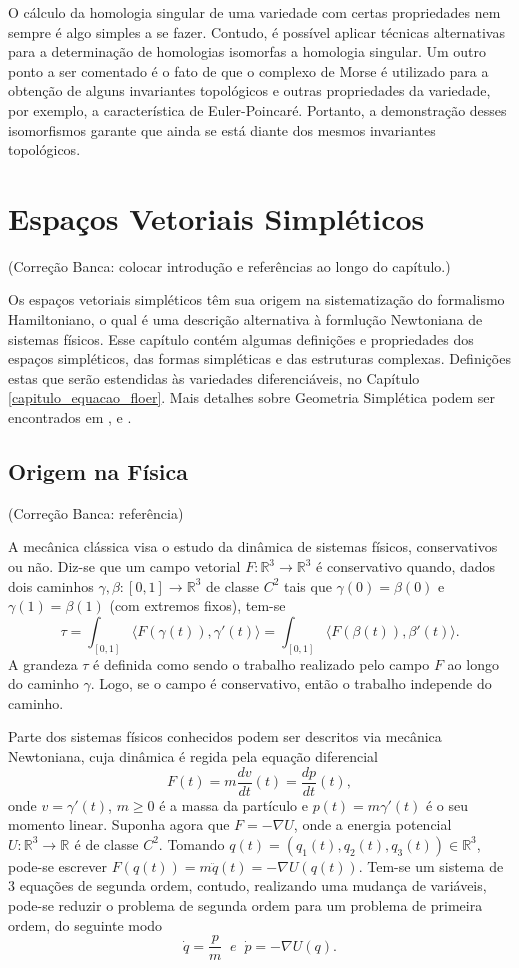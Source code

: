 \documentclass[12pt]{book}
\newcommand{\derivada}[2]{\frac{d #1}{d #2}}
\newcommand{\intervalo}{[0,1]}
\newcommand{\produtointerno}[2]{\langle #1, #2 \rangle}
\newcommand{\real}[1]{\mathbb{R}^{#1}}
\newcommand{\reta}{\real{}}
\newcommand{\alerta}[1]{{\color{red}#1}}
\newcommand{\correcaobanca}[1]{\alerta{(Correção Banca: #1)}}
\begin{document}
	O cálculo da homologia singular de uma variedade com certas propriedades nem sempre é algo simples a se fazer. Contudo, é possível aplicar técnicas alternativas para a determinação de homologias isomorfas a homologia singular. Um outro ponto a ser comentado é o fato de que o complexo de Morse é utilizado para a obtenção de alguns invariantes topológicos e outras propriedades  da variedade, por exemplo, a característica de Euler-Poincaré. Portanto, a demonstração desses isomorfismos garante que ainda se está diante dos mesmos invariantes topológicos.
	
	
	\chapter{Espaços Vetoriais Simpléticos}\label{capitulo_espacos_vetoriais_simpleticos}
	\correcaobanca{colocar introdução e referências ao longo do capítulo.}
	
	Os espaços vetoriais simpléticos têm sua origem na sistematização do formalismo Hamiltoniano, o qual é uma descrição alternativa à formlução Newtoniana de sistemas físicos. Esse capítulo contém algumas definições e propriedades dos espaços simpléticos, das formas simpléticas e das estruturas complexas. Definições estas que serão estendidas às variedades diferenciáveis, no Capítulo \ref{capitulo_equacao_floer}. Mais detalhes sobre Geometria Simplética podem ser encontrados em \cite{berndt}, \cite{bursztyn_macarini} e \cite{cannas_anna}. 
	
	\section{Origem na Física}
	\correcaobanca{referência}
	
	A mecânica clássica visa o estudo da dinâmica de sistemas físicos, conservativos ou não. Diz-se que um campo vetorial $F:\real{3} \to \real{3}$ é conservativo quando, dados dois caminhos $\gamma,\beta:[0,1] \to \real{3}$ de classe $C^{2}$ tais que $\gamma(0)=\beta(0)$ e $\gamma(1)=\beta(1)$ (com extremos fixos), tem-se
	$$
	\tau=\int_{\intervalo} \produtointerno{F(\gamma(t))}{\gamma'(t)}=
	\int_{\intervalo} \produtointerno{F(\beta(t))}{\beta'(t)}.
	$$
	A grandeza $\tau$ é definida como sendo o trabalho realizado pelo campo $F$ ao longo do caminho $\gamma$. Logo, se o campo é conservativo, então o trabalho independe do caminho.
	
	Parte dos sistemas físicos conhecidos podem ser descritos via mecânica Newtoniana, cuja dinâmica é regida pela equação diferencial 
	$$
	F(t) = m\derivada{v}{t}(t) = \derivada{p}{t}(t),
	$$
	onde $v = \gamma'(t)$, $m\geq0$ é a massa da partículo e $p(t) = m\gamma'(t)$ é o seu momento linear. Suponha agora que $F = -\nabla U$, onde a energia potencial $U:\real{3}\to \reta$ é de classe $C^{2}$. Tomando $q(t)=(q_{1}(t),q_{2}(t), q_{3}(t))\in \real{3}$, pode-se escrever $F(q(t)) =m \ddot{q}(t)= -\nabla U(q(t))$. Tem-se um sistema de 3 equações de segunda ordem, contudo, realizando uma mudança de variáveis, pode-se reduzir o problema de segunda ordem para um problema de primeira ordem, do seguinte modo
	$$
	\dot{q} = \frac{p}{m} \;\; e \;\;\dot{p} = -\nabla U(q).
	$$
	
\end{document}
